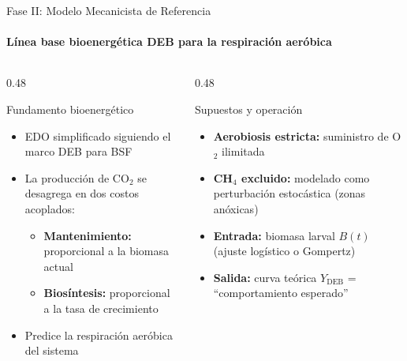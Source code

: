 \documentclass[aspectratio=169, 11pt]{beamer}
\begin{document}
\begin{frame}{Fase II: Modelo Mecanicista de Referencia}
\framesubtitle{Línea base bioenergética DEB para la respiración aeróbica}
\vspace{-0.5cm}
\begin{columns}[T,onlytextwidth]

\begin{column}{0.48\textwidth}

\begin{block}{Fundamento bioenergético}
\scriptsize
\begin{itemize}
    \item EDO simplificado siguiendo el marco DEB para BSF \textcite{eriksenDynamicModellingFeed2022}
    \item La producción de CO$_2$ se desagrega en dos costos acoplados:
    \begin{itemize}
        \scriptsize
        \item \textbf{Mantenimiento:} proporcional a la biomasa actual
        \item \textbf{Biosíntesis:} proporcional a la tasa de crecimiento
    \end{itemize}
    \item Predice la respiración aeróbica del sistema
\end{itemize}
\end{block}

\end{column}

\begin{column}{0.48\textwidth}

\begin{block}{Supuestos y operación}
\scriptsize
\begin{itemize}
    \item \textbf{Aerobiosis estricta:} suministro de O$_2$ ilimitada
    \item \textbf{CH$_4$ excluido:} modelado como perturbación estocástica (zonas anóxicas)
    \item \textbf{Entrada:} biomasa larval $B(t)$ (ajuste logístico o Gompertz)
    \item \textbf{Salida:} curva teórica $Y_{\text{DEB}}$ = ``comportamiento esperado''
\end{itemize}
\end{block}


\end{column}
\end{columns}
\end{frame}
\end{document}
